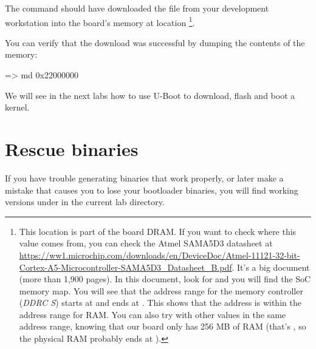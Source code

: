 The  command should have downloaded the
 file from your development workstation into
the board's memory at location \footnote{
This location is part of the board DRAM. If you want
to check where this value comes from, you can check the Atmel SAMA5D3
datasheet at
\url{https://ww1.microchip.com/downloads/en/DeviceDoc/Atmel-11121-32-bit-Cortex-A5-Microcontroller-SAMA5D3_Datasheet_B.pdf}.
It's a big document (more than 1,900 pages). In this document, look
for  and you will find the SoC memory map. You
will see that the address range for the memory controller ({\em DDRC
S}) starts at  and ends at . This
shows that the  address is within the address range
for RAM. You can also try with other values in the same address range,
knowing that our board only has 256 MB of RAM (that's
, so the physical RAM probably ends at
).}.

You can verify that the download was successful by dumping the
contents of the memory:

\begin{ubootinput}
=> md 0x22000000
\end{ubootinput}

We will see in the next labs how to use U-Boot to download, flash and
boot a kernel.

\section{Rescue binaries}

If you have trouble generating binaries that work properly, or later
make a mistake that causes you to lose your bootloader binaries, you
will find working versions under  in the current lab
directory.
